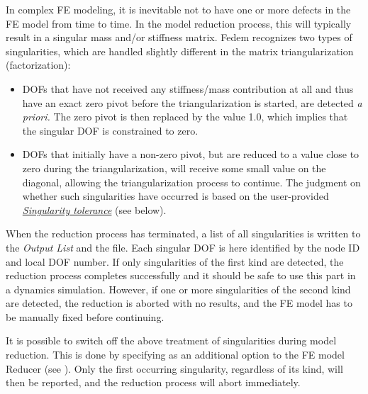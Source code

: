 {In complex FE modeling, it is inevitable not to have one or more defects in the
FE model from time to time. In the model reduction process, this will typically
result in a singular mass and/or stiffness matrix. Fedem recognizes two types of
singularities, which are handled slightly different in the matrix
triangularization (factorization):

\begin{itemize}
\item
  DOFs that have not received any stiffness/mass contribution at all and
  thus have an exact zero pivot before the triangularization is started,
  are detected {\sl a priori.} The zero pivot is then replaced by the value 1.0,
  which implies that the singular DOF is constrained to zero.
\item
  DOFs that initially have a non-zero pivot, but are reduced to a value
  close to zero during the triangularization, will receive some small
  value on the diagonal, allowing the triangularization process to continue.
  The judgment on whether such singularities have occurred is based on
  the user-provided \protect\hyperlink{singularity-tolerance}
  {\sl Singularity tolerance} (see below).
\end{itemize}

When the reduction process has terminated, a list of all singularities
is written to the {\sl Output List} and the  file.
Each singular DOF is here identified by the node ID and local DOF number.
If only singularities of the first kind are detected, the reduction process
completes successfully and it should be safe to use this part in a dynamics
simulation. However, if one or more singularities of the second kind are
detected, the reduction is aborted with no results, and the FE model has to be
manually fixed before continuing.


It is possible to switch off the above treatment of singularities during
model reduction. This is done by specifying 
as an additional option to the FE model Reducer (see
).
Only the first occurring singularity, regardless of its kind,
will then be reported, and the reduction process will abort immediately.

}
